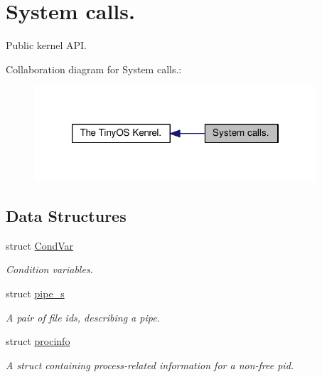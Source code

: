 \hypertarget{group__syscalls}{\section{System calls.}
\label{group__syscalls}
}


Public kernel A\-P\-I.  


Collaboration diagram for System calls.\-:
\nopagebreak
\begin{figure}[H]
\begin{center}
\leavevmode
\includegraphics[width=298pt]{group__syscalls}
\end{center}
\end{figure}
\subsection*{Data Structures}
\begin{DoxyCompactItemize}
\item 
struct \hyperlink{structCondVar}{Cond\-Var}
\begin{DoxyCompactList}\small\item\em Condition variables. \end{DoxyCompactList}\item 
struct \hyperlink{structpipe__s}{pipe\-\_\-s}
\begin{DoxyCompactList}\small\item\em A pair of file ids, describing a pipe. \end{DoxyCompactList}\item 
struct \hyperlink{structprocinfo}{procinfo}
\begin{DoxyCompactList}\small\item\em A struct containing process-\/related information for a non-\/free pid. \end{DoxyCompactList}\end{DoxyCompactItemize}
